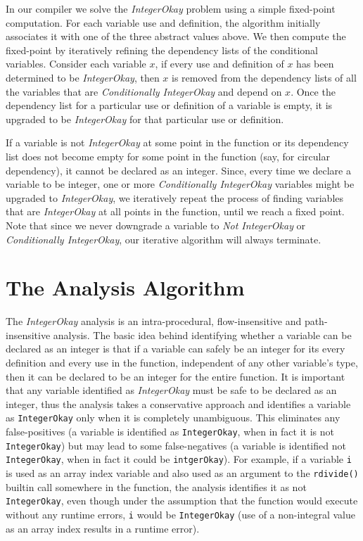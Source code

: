In our \mixten compiler we solve the \emph{IntegerOkay} problem using a
simple fixed-point computation.   For each variable use and definition,
the algorithm initially associates it with one of the three abstract
values above.  
We then compute the fixed-point by iteratively refining the dependency lists
of the conditional variables.  Consider each variable $x$, if every use
and definition of $x$ has been determined to be \emph{IntegerOkay}, then
$x$ is removed from the dependency lists of all the variables that are
\emph{Conditionally IntegerOkay} and depend on $x$.  Once the dependency
list for a particular use or definition of a variable is empty, it is
upgraded to be \emph{IntegerOkay} for that particular use or definition.

If a variable is not \emph{IntegerOkay} at some point in the function or
its dependency list does not become empty for some point in the function
(say, for circular dependency), it cannot be declared as an integer.
Since, every time we declare a variable to be integer, one or more
\emph{Conditionally IntegerOkay} variables might be upgraded to
\emph{IntegerOkay}, we iteratively repeat the process of finding
variables that are \emph{IntegerOkay} at all points in the function,
until we reach a fixed point. Note that since we never downgrade a
variable to \emph{Not IntegerOkay} or \emph{Conditionally IntegerOkay},
our iterative algorithm will always terminate. 


\section{The Analysis Algorithm}\label{sec:algo}

The \emph{IntegerOkay} analysis is an intra-procedural, flow-insensitive and
path-insensitive analysis. The basic idea behind identifying whether a
variable can be declared as an integer is that if a variable can safely be an
integer for its every definition and every use in the function, independent of
any other variable's type, then it can be declared to be an integer for the
entire function. It is important that any variable identified as
\emph{IntegerOkay} must be safe to be declared as an integer, thus the
analysis takes a conservative approach and identifies a variable as
\texttt{IntegerOkay} only when it is completely unambiguous. This eliminates
any false-positives (a variable is identified as \texttt{IntegerOkay}, when in
fact it is not \texttt{IntegerOkay}) but may lead to some false-negatives (a
variable is identified not \texttt{IntegerOkay}, when in fact it could be
\texttt{intgerOkay}). For example, if a variable \texttt{i} is used as an
array index variable and also used as an argument to the \texttt{rdivide()}
builtin call somewhere in the function, the analysis identifies it as not
\texttt{IntegerOkay}, even though under the assumption that the function would
execute without any runtime errors, \texttt{i} would be \texttt{IntegerOkay}
(use of a non-integral value as an array index results in a runtime error).       

